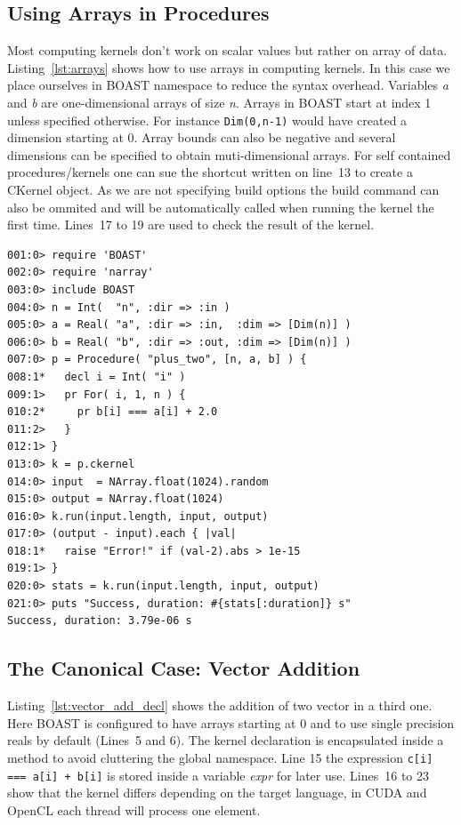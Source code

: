 \documentclass[11pt, a4paper, twoside]{montblanc}
\begin{document}
\subsection*{Using Arrays in Procedures}

Most computing kernels don't work on scalar values but rather on array of
data. Listing~\ref{lst:arrays} shows how to use arrays in computing kernels.
In this case we place ourselves in BOAST namespace to reduce the syntax
overhead. Variables \textit{a} and \textit{b} are one-dimensional arrays of
size \textit{n}. Arrays in BOAST start at index 1 unless specified otherwise.
For instance \lstinline!Dim(0,n-1)! would have created a dimension starting at
0. Array bounds can also be negative and several dimensions can be specified
to obtain muti-dimensional arrays.
For self contained procedures/kernels one can sue the shortcut written on
line~13 to create a CKernel object. As we are not specifying build options the
build command can also be ommited and will be automatically called when
running the kernel the first time. Lines~17 to 19 are used to check the result
of the kernel.

\begin{lstlisting}
001:0> require 'BOAST'
002:0> require 'narray'
003:0> include BOAST
004:0> n = Int(  "n", :dir => :in )
005:0> a = Real( "a", :dir => :in,  :dim => [Dim(n)] )
006:0> b = Real( "b", :dir => :out, :dim => [Dim(n)] )
007:0> p = Procedure( "plus_two", [n, a, b] ) {
008:1*   decl i = Int( "i" )
009:1>   pr For( i, 1, n ) {
010:2*     pr b[i] === a[i] + 2.0
011:2>   }
012:1> }
013:0> k = p.ckernel
014:0> input  = NArray.float(1024).random
015:0> output = NArray.float(1024)
016:0> k.run(input.length, input, output)
017:0> (output - input).each { |val|
018:1*   raise "Error!" if (val-2).abs > 1e-15
019:1> }
020:0> stats = k.run(input.length, input, output)
021:0> puts "Success, duration: #{stats[:duration]} s"
Success, duration: 3.79e-06 s
\end{lstlisting}

\subsection*{The Canonical Case: Vector Addition}

Listing~\ref{lst:vector_add_decl} shows the addition of two vector in a third
one. Here BOAST is configured to have arrays starting at 0 and to use single
precision reals by default (Lines~5 and 6).  The kernel declaration is
encapsulated inside a method to avoid cluttering the global namespace. Line 15
the expression \lstinline!c[i] === a[i] + b[i]! is stored inside a variable
\textit{expr} for later use. Lines~16 to 23 show that the kernel differs
depending on the target language, in CUDA and OpenCL each thread will process
one element.
\end{document}
